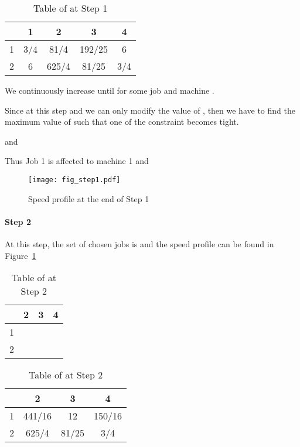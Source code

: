 \documentclass[11pt,a4paper]{article}
\begin{document}
\begin{table}[H]
\centering
\begin{tabular}{|c|c|c|c|c|}
\hline 
 & 1 & 2 & 3 & 4 \\ 
\hline 
1 & 3/4 & 81/4 & 192/25 & 6 \\ 
\hline 
2 & 6 & 625/4 & 81/25 & 3/4 \\ 
\hline 
\end{tabular} 
\caption{Table of  at Step 1}
\end{table}

We continuously increase  until
		 for some job  
		and machine .

Since  at this step and we can only modify 
the value of , then we have to find the maximum 
value of  such that one of the constraint becomes tight.

 and 


Thus Job 1 is affected to machine 1 and 


\begin{figure}[H]
\begin{center}
\texttt{[image: fig\_step1.pdf]} 
\end{center}
\caption{Speed profile  at the end of Step 1}
\label{speed_profile_step1}
\end{figure}



\paragraph{Step 2}

At this step, the set of chosen jobs is  and the speed profile  can be found in Figure~\ref{speed_profile_step1}

\begin{table}[H]
\centering
\begin{tabular}{|c|c|c|c|}
\hline 
  & 2 & 3 & 4 \\ 
\hline 
1  &  &  &  \\ 
\hline 
2 &  &  &  \\ 
\hline 
\end{tabular} 
\caption{Table of  at Step 2}
\end{table}




\begin{table}[H]
\centering
\begin{tabular}{|c|c|c|c|}
\hline 
 & 2 & 3 & 4 \\ 
\hline 
1 & 441/16 & 12 & 150/16 \\ 
\hline 
2  & 625/4 & 81/25 & 3/4 \\ 
\hline 
\end{tabular} 
\caption{Table of  at Step 2}
\end{table}
\end{document}
